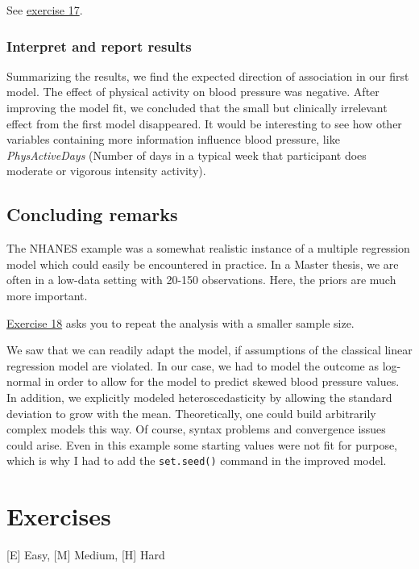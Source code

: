 \documentclass[
]{book}
\begin{document}
See \hyperref[exercise17_multiple_regression]{exercise 17}.

\subsubsection{Interpret and report results}\label{interpret-and-report-results}

Summarizing the results, we find the expected direction of association in our first model.
The effect of physical activity on blood pressure was negative.
After improving the model fit, we concluded that the small but clinically irrelevant effect
from the first model disappeared.
It would be interesting to see how other variables containing more information
influence blood pressure, like \emph{PhysActiveDays} (Number of days in a typical week
that participant does moderate or vigorous intensity activity).

\subsection{Concluding remarks}\label{concluding-remarks}

The NHANES example was a somewhat realistic instance of a multiple regression model
which could easily be encountered in practice. In a Master thesis, we are often in
a low-data setting with 20-150 observations. Here, the priors are much more important.

\hyperref[exercise18_multiple_regression]{Exercise 18} asks you to repeat the analysis
with a smaller sample size.

We saw that we can readily adapt the model, if assumptions of the classical
linear regression model are violated. In our case, we had to model the outcome
as log-normal in order to allow for the model to predict skewed blood pressure values.
In addition, we explicitly modeled heteroscedasticity by allowing the standard deviation
to grow with the mean. Theoretically, one could build arbitrarily complex models
this way. Of course, syntax problems and convergence issues could arise.
Even in this example some starting values were not fit for purpose, which is why
I had to add the \texttt{set.seed()} command in the improved model.

\section{Exercises}\label{exercises-2}

{[}E{]} Easy, {[}M{]} Medium, {[}H{]} Hard
\end{document}
